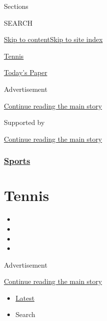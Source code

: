 Sections

SEARCH

\protect\hyperlink{site-content}{Skip to
content}\protect\hyperlink{site-index}{Skip to site index}

\href{https://www.nytimes3xbfgragh.onion/section/sports/tennis}{Tennis}

\href{https://myaccount.nytimes3xbfgragh.onion/auth/login?response_type=cookie\&client_id=vi}{}

\href{https://www.nytimes3xbfgragh.onion/section/todayspaper}{Today's
Paper}

Advertisement

\protect\hyperlink{after-top}{Continue reading the main story}

Supported by

\protect\hyperlink{after-sponsor}{Continue reading the main story}

\hypertarget{sports}{%
\subsubsection{\texorpdfstring{\href{/section/sports}{Sports}}{Sports}}\label{sports}}

\hypertarget{tennis}{%
\section{Tennis}\label{tennis}}

\begin{itemize}
\item
\item
\item
\item
\end{itemize}

Advertisement

\protect\hyperlink{after-subheader}{Continue reading the main story}

\begin{itemize}
\tightlist
\item
  \protect\hyperlink{stream-panel}{Latest}
\item
  Search
\end{itemize}

